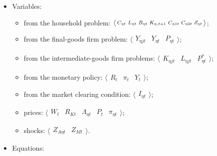 \documentclass[../thesis.tex]{subfiles}
\begin{document}
{\singlespacing
	
	\begin{itemize}

		\item Variables:
		
	\begin{itemize}
	
		\item from the household problem: $\langle \begin{smallmatrix} C_{\eta t} & L_{\eta t} & B_{\eta t} & K_{\eta, t+1} & C_{\eta 1t} & C_{\eta 2t} & {\mathscr{E}_{\eta t}} \end{smallmatrix} \rangle$;
		
		\item from the final-goods firm problem: $\langle \begin{smallmatrix} Y_{\eta jt} & Y_{\eta t} & P_{\eta t} \end{smallmatrix} \rangle$;

		\item from the intermediate-goods firm problems: $\langle \begin{smallmatrix} K_{\eta jt} & L_{\eta jt} & P_{\eta t}^{\ast} \end{smallmatrix} \rangle$;
		
		\item from the monetary policy: $\langle \begin{smallmatrix} R_{t} & \pi_{t} & Y_{t} \end{smallmatrix} \rangle$;
		
		\item from the market clearing condition: $\langle \begin{smallmatrix} I_{\eta t} \end{smallmatrix} \rangle$;
		
		\item prices: $\langle \begin{smallmatrix} W_{t} & R_{Kt} & \Lambda_{\eta t} & P_{t} & \pi_{\eta t} \end{smallmatrix} \rangle$;
		
		\item shocks: $\langle \begin{smallmatrix} Z_{A\eta t} & Z_{Mt} \end{smallmatrix} \rangle$.

	\end{itemize}

		\item Equations:
		

\end{itemize}}
\end{document}
